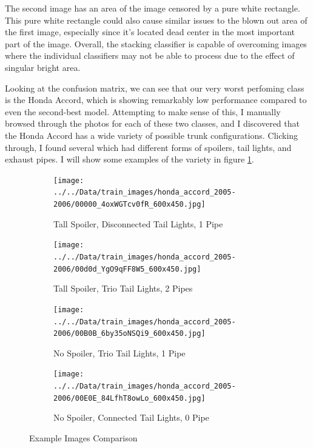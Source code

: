 \documentclass[12pt]{article}
\begin{document}
The second image has an area of the image censored by a pure white rectangle. This pure white rectangle could also 
cause similar issues to the blown out area of the first image, especially since it's located dead center in the
most important part of the image. Overall, the stacking classifier is capable of overcoming images where 
the individual classifiers may not be able to process due to the effect of singular bright area.


Looking at the confusion matrix, we can see that our very worst perfoming class is the Honda Accord, which is showing 
remarkably low performance compared to even the second-best model. Attempting to make sense of this, I manually browsed 
through the photos for each of these two classes, and I discovered that the Honda Accord has a wide variety of possible 
trunk configurations. Clicking through, I found several which had different forms of spoilers, tail lights, and exhaust 
pipes. I will show some examples of the variety in figure \ref{figure6}.

\begin{figure}
  \begin{subfigure}{.5\textwidth}
    \texttt{[image: ../../Data/train\_images/honda\_accord\_2005-2006/00000\_4oxWGTcv0fR\_600x450.jpg]}
      \caption{Tall Spoiler, Disconnected Tail Lights, 1 Pipe}
      \end{subfigure}%
    \begin{subfigure}{.5\textwidth}
      \texttt{[image: ../../Data/train\_images/honda\_accord\_2005-2006/00d0d\_YgO9qFF8W5\_600x450.jpg]}
      \caption{Tall Spoiler, Trio Tail Lights, 2 Pipes}
    \end{subfigure}
    \begin{subfigure}{.5\textwidth}
    \texttt{[image: ../../Data/train\_images/honda\_accord\_2005-2006/00B0B\_6by35oNSQi9\_600x450.jpg]}
      \caption{No Spoiler, Trio Tail Lights, 1 Pipe}
    \end{subfigure}%
    \begin{subfigure}{.5\textwidth}
      \texttt{[image: ../../Data/train\_images/honda\_accord\_2005-2006/00E0E\_84LfhT8owLo\_600x450.jpg]}
      \caption{No Spoiler, Connected Tail Lights, 0 Pipe}
    \end{subfigure}

    \caption{Example Images Comparison}
    \label{figure6}
\end{figure}
\end{document}
